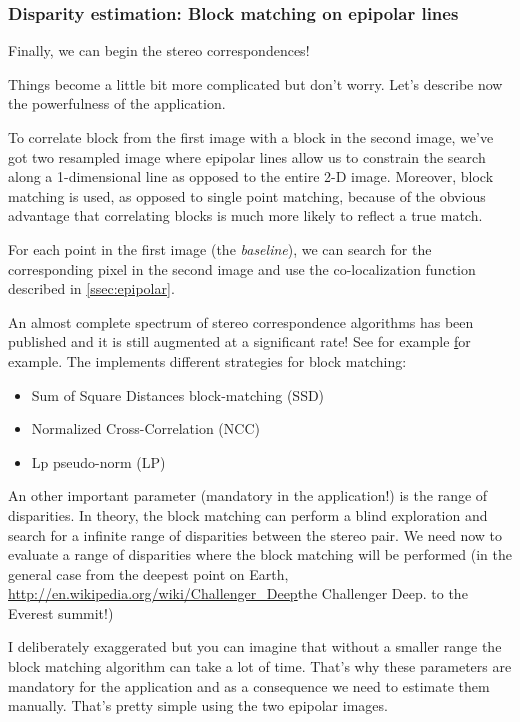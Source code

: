 \subsubsection{Disparity estimation: Block matching on epipolar lines}

Finally, we can begin the stereo correspondences!

Things become a little bit more complicated but don't worry. Let's describe
now the powerfulness of the  application.

To correlate block from the first image with a block in the second image, we've
got two resampled image where epipolar lines allow us to constrain the
search along a 1-dimensional line as opposed to the entire 2-D
image. Moreover, block matching is used, as opposed to single point matching,
because of the obvious advantage that correlating blocks is much more likely to
reflect a true match.

For each point in the first image (the \textit{baseline}), we can search for the
corresponding pixel in the second image and use the co-localization function
described in \ref{ssec:epipolar}.

An almost complete spectrum of stereo correspondence algorithms has been
published and it is still augmented at a significant rate!
See for example \href{http://en.wikipedia.org/wiki/Block-matching_algorithm} for example. The
\otb implements different strategies for block matching:

\begin{itemize}
\item Sum of Square Distances block-matching (SSD)
\item Normalized Cross-Correlation (NCC)
\item Lp pseudo-norm (LP)
\end{itemize}

An other important parameter (mandatory in the application!) is the range of
disparities. In theory, the block matching can perform a blind exploration and
search for a infinite range of disparities between the stereo pair. We need now
to evaluate a range of disparities where the block matching will be performed (in the general case from the deepest point on
Earth, \url{http://en.wikipedia.org/wiki/Challenger_Deep}{the Challenger Deep}.
to the Everest summit!)

I deliberately exaggerated but you can imagine that without a smaller range
the block matching algorithm can take a lot of time.  That's why
these parameters are mandatory for the application and as a consequence we need to
estimate them manually. That's pretty simple using the two epipolar images.

